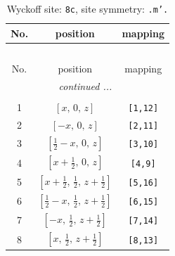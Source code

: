 \documentclass[fleqn,8pt]{jsarticle}
\begin{document}
\renewcommand{\arraystretch}{1.2}
\begin{longtable}{ccc}
\caption{Wyckoff site: {\tt 8c}, site symmetry: {\tt .m'.}}
 \\
 \hline \hline
No. & position & mapping \\ \hline \endfirsthead

\multicolumn{2}{l}{\tablename\ \thetable{}} \\
 \hline \hline
No. & position & mapping \\ \hline \endhead

 \hline \hline
\multicolumn{2}{r}{\footnotesize\it continued ...} \\ \endfoot

 \hline \hline
\multicolumn{2}{r}{} \\ \endlastfoot

1 & $\left[ x,\, 0,\, z \right]$ & {\tt [1,12]} \\ \hline
2 & $\left[ - x,\, 0,\, z \right]$ & {\tt [2,11]} \\ \hline
3 & $\left[ \frac{1}{2} - x,\, 0,\, z \right]$ & {\tt [3,10]} \\ \hline
4 & $\left[ x + \frac{1}{2},\, 0,\, z \right]$ & {\tt [4,9]} \\ \hline
5 & $\left[ x + \frac{1}{2},\, \frac{1}{2},\, z + \frac{1}{2} \right]$ & {\tt [5,16]} \\ \hline
6 & $\left[ \frac{1}{2} - x,\, \frac{1}{2},\, z + \frac{1}{2} \right]$ & {\tt [6,15]} \\ \hline
7 & $\left[ - x,\, \frac{1}{2},\, z + \frac{1}{2} \right]$ & {\tt [7,14]} \\ \hline
8 & $\left[ x,\, \frac{1}{2},\, z + \frac{1}{2} \right]$ & {\tt [8,13]} \\
\end{longtable}
\renewcommand{\arraystretch}{1.2}
\end{document}
